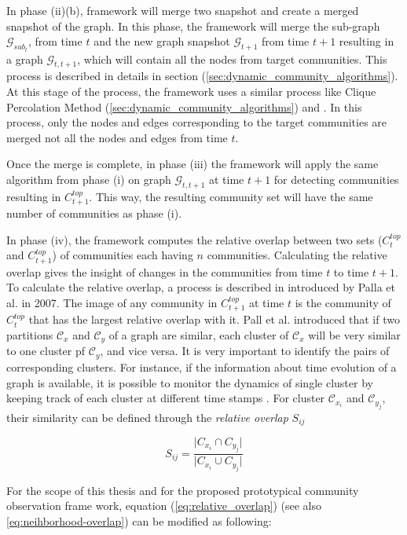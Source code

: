 In phase (ii)(b), framework will merge two snapshot and create a merged snapshot of the graph. In this phase, the framework will merge the sub-graph $\mathcal{G}_{sub_{t}}$, from time $t$ and the new graph snapshot $\mathcal{G}_{t+1}$ from time $t+1$ resulting in a graph $\mathcal{G}_{t, t+1}$, which will contain all the nodes from target communities. This process is described in details in section (\ref{sec:dynamic_community_algorithms}). At this stage of the process, the framework uses a similar process like Clique Percolation Method (\ref{sec:dynamic_community_algorithms}) and \cite{ref-23}. In this process, only the nodes and edges corresponding to the target communities are merged not all the nodes and edges from time $t$.

Once the merge is complete, in phase (iii) the framework will apply the same algorithm from phase (i) on graph $\mathcal{G}_{t, t+1}$ at  time $t+1$ for detecting communities resulting in $C_{t+1}^{top}$. This way, the resulting community set will have the same number of communities as phase (i).

In phase (iv), the framework computes the relative overlap between two sets ($C_t^{top}$ and $C_{t+1}^{top}$) of communities each having $n$ communities. Calculating the relative overlap gives the insight of changes in the communities from time $t$ to time $t+1$. To calculate the relative overlap, a process is described in \cite{ref-23} introduced by Palla et al. in 2007. The image of any community in $C_{t+1}^{top}$ at time $t$ is the community of $C_t^{top}$ that has the largest relative overlap with it. Pall et al. introduced that if two partitions $\mathcal{C}_x$ and $\mathcal{C}_y$ of a graph are similar, each cluster of $\mathcal{C}_x$ will be very similar to one cluster pf $\mathcal{C}_y$, and vice versa. It is very important to identify the pairs of corresponding clusters. For instance, if the information about time evolution of a graph is available, it is possible to monitor the dynamics of single cluster by keeping track of each cluster at different time stamps \cite{ref-23}. For cluster $\mathcal{C}_{x_{i}}$ and $\mathcal{C}_{y_{j}}$, their similarity can be defined through the \textit{relative overlap} $S_{ij}$

\begin{equation}\label{eq:relative_overlap}
S_{ij} = \dfrac{\lvert C_{x_{i}} \cap C_{y_{j}} \rvert}{\lvert C_{x_{i}} \cup C_{y_{j}} \rvert}
\end{equation} 

For the scope of this thesis and for the proposed prototypical community observation frame work, equation (\ref{eq:relative_overlap}) (see also \ref{eq:neihborhood-overlap}) can be modified as following:

